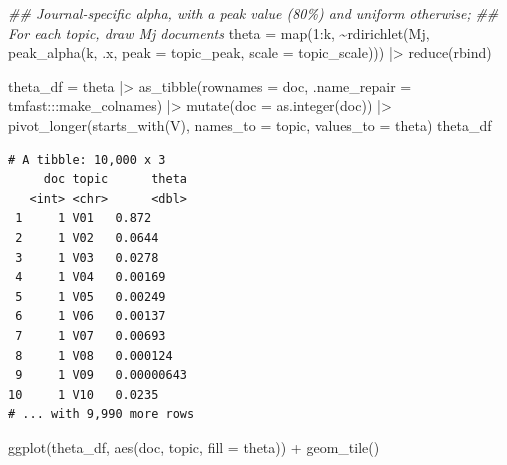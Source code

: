 \documentclass[
]{article}
\newenvironment{Shaded}{\begin{snugshade}}{\end{snugshade}}
\newcommand{\AttributeTok}[1]{\textcolor[rgb]{0.40,0.45,0.13}{#1}}
\newcommand{\DecValTok}[1]{\textcolor[rgb]{0.68,0.00,0.00}{#1}}
\newcommand{\DocumentationTok}[1]{\textcolor[rgb]{0.37,0.37,0.37}{\textit{#1}}}
\newcommand{\FunctionTok}[1]{\textcolor[rgb]{0.28,0.35,0.67}{#1}}
\newcommand{\NormalTok}[1]{\textcolor[rgb]{0.00,0.23,0.31}{#1}}
\newcommand{\OtherTok}[1]{\textcolor[rgb]{0.00,0.23,0.31}{#1}}
\newcommand{\SpecialCharTok}[1]{\textcolor[rgb]{0.37,0.37,0.37}{#1}}
\newcommand{\StringTok}[1]{\textcolor[rgb]{0.13,0.47,0.30}{#1}}
\begin{document}
\begin{Shaded}
\begin{Highlighting}[]
\DocumentationTok{\#\# Journal{-}specific alpha, with a peak value (80\%) and uniform otherwise; }
\DocumentationTok{\#\# For each topic, draw Mj documents}
\NormalTok{theta }\OtherTok{=} \FunctionTok{map}\NormalTok{(}\DecValTok{1}\SpecialCharTok{:}\NormalTok{k, }
            \SpecialCharTok{\textasciitilde{}}\FunctionTok{rdirichlet}\NormalTok{(Mj, }
                        \FunctionTok{peak\_alpha}\NormalTok{(k, .x, }
                                   \AttributeTok{peak =}\NormalTok{ topic\_peak, }
                                   \AttributeTok{scale =}\NormalTok{ topic\_scale))) }\SpecialCharTok{|\textgreater{}} 
    \FunctionTok{reduce}\NormalTok{(rbind)}

\NormalTok{theta\_df }\OtherTok{=}\NormalTok{ theta }\SpecialCharTok{|\textgreater{}}
    \FunctionTok{as\_tibble}\NormalTok{(}\AttributeTok{rownames =} \StringTok{\textquotesingle{}doc\textquotesingle{}}\NormalTok{, }
              \AttributeTok{.name\_repair =}\NormalTok{ tmfast}\SpecialCharTok{:::}\NormalTok{make\_colnames) }\SpecialCharTok{|\textgreater{}}
    \FunctionTok{mutate}\NormalTok{(}\AttributeTok{doc =} \FunctionTok{as.integer}\NormalTok{(doc)) }\SpecialCharTok{|\textgreater{}}
    \FunctionTok{pivot\_longer}\NormalTok{(}\FunctionTok{starts\_with}\NormalTok{(}\StringTok{\textquotesingle{}V\textquotesingle{}}\NormalTok{),}
                 \AttributeTok{names\_to =} \StringTok{\textquotesingle{}topic\textquotesingle{}}\NormalTok{,}
                 \AttributeTok{values\_to =} \StringTok{\textquotesingle{}theta\textquotesingle{}}\NormalTok{)}
\NormalTok{theta\_df}
\end{Highlighting}
\end{Shaded}

\begin{verbatim}
# A tibble: 10,000 x 3
     doc topic      theta
   <int> <chr>      <dbl>
 1     1 V01   0.872     
 2     1 V02   0.0644    
 3     1 V03   0.0278    
 4     1 V04   0.00169   
 5     1 V05   0.00249   
 6     1 V06   0.00137   
 7     1 V07   0.00693   
 8     1 V08   0.000124  
 9     1 V09   0.00000643
10     1 V10   0.0235    
# ... with 9,990 more rows
\end{verbatim}

\begin{Shaded}
\begin{Highlighting}[]
\FunctionTok{ggplot}\NormalTok{(theta\_df, }\FunctionTok{aes}\NormalTok{(doc, topic, }\AttributeTok{fill =}\NormalTok{ theta)) }\SpecialCharTok{+}
    \FunctionTok{geom\_tile}\NormalTok{()}
\end{Highlighting}
\end{Shaded}
\end{document}
